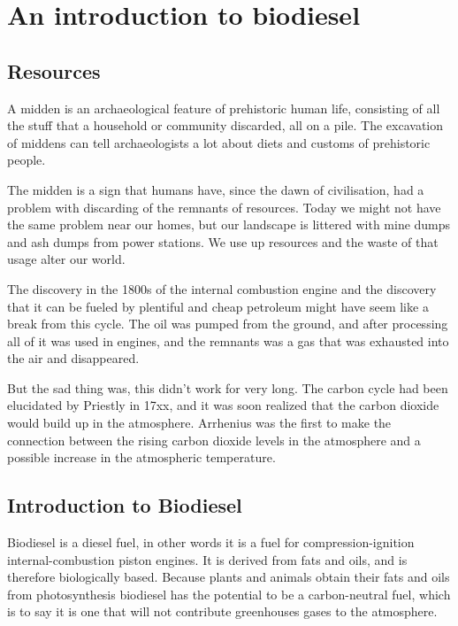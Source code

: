 
\chapter{An introduction to biodiesel} %
\label{Chapter1}


\section{Resources}

A midden is an archaeological feature of prehistoric human life, consisting of all the stuff that a household or community discarded, all on a pile. The excavation of middens can tell archaeologists a lot about diets and customs of prehistoric people.

The midden is a sign that humans have, since the dawn of civilisation, had a problem with discarding of the remnants of resources. Today we  might not have the same problem near our homes, but our landscape is littered with mine dumps and ash dumps from power stations. We use up resources and the waste of that usage alter our world.

The discovery in the 1800s of the internal combustion engine and the discovery that it can be fueled by plentiful and cheap petroleum might have seem like a break from this cycle. The oil was pumped from the ground, and after processing all of it was used in engines, and the remnants was a gas that was exhausted into the air and disappeared. 

But the sad thing was, this didn't work for very long. The carbon cycle had been elucidated by Priestly in 17xx, and it was soon realized that the carbon dioxide would build up in the atmosphere. Arrhenius was the first to make the connection between the rising carbon dioxide levels in the atmosphere and a possible increase in the atmospheric temperature.

\section{Introduction to Biodiesel}

Biodiesel is a diesel fuel, in other words it is a fuel for compression-ignition internal-combustion piston engines. It is derived from fats and oils, and is therefore biologically based. Because plants and animals obtain their fats and oils from photosynthesis biodiesel has the potential to be a carbon-neutral fuel, which is to say it is one that will not contribute greenhouses gases to the atmosphere.

